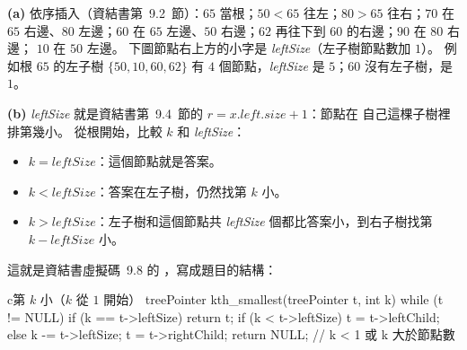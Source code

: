\begin{pastsoln}
\textbf{(a)} 依序插入（資結書第~9.2~節）：$65$ 當根；$50 < 65$ 往左；$80 > 65$ 往右；$70$ 在 $65$
右邊、$80$ 左邊；$60$ 在 $65$ 左邊、$50$ 右邊；$62$ 再往下到 $60$ 的右邊；$90$ 在 $80$ 右邊；
$10$ 在 $50$ 左邊。 下圖節點右上方的小字是 \textit{leftSize}（左子樹節點數加 $1$）。 例如根
$65$ 的左子樹 $\{50, 10, 60, 62\}$ 有 $4$ 個節點，\textit{leftSize} 是 $5$；$60$ 沒有左子樹，是
$1$。

\begin{center}
\end{center}

\textbf{(b)} \textit{leftSize} 就是資結書第~9.4~節的 $r = x.\mathit{left}.\mathit{size} + 1$：節點在
自己這棵子樹裡排第幾小。 從根開始，比較 $k$ 和 \textit{leftSize}：
\begin{itemize}
\item $k = \textit{leftSize}$：這個節點就是答案。
\item $k < \textit{leftSize}$：答案在左子樹，仍然找第 $k$ 小。
\item $k > \textit{leftSize}$：左子樹和這個節點共 \textit{leftSize} 個都比答案小，到右子樹找第
$k - \textit{leftSize}$ 小。
\end{itemize}
這就是資結書虛擬碼~9.8 的 ，寫成題目的結構：

\begin{code}{c}{第 $k$ 小（$k$ 從 $1$ 開始）}
treePointer kth_smallest(treePointer t, int k)
{
    while (t != NULL) {
        if (k == t->leftSize)
            return t;
        if (k < t->leftSize) {
            t = t->leftChild;
        } else {
            k -= t->leftSize;
            t = t->rightChild;
        }
    }
    return NULL;            // k < 1 或 k 大於節點數
}
\end{code}


\end{pastsoln}
